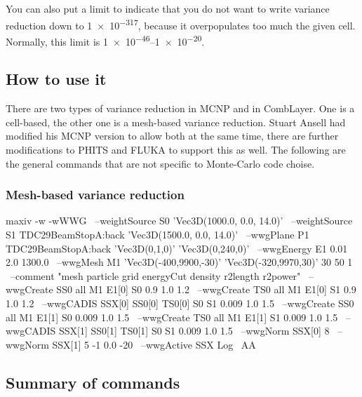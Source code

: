 You can also put a limit to indicate that you do not want to write variance reduction down to \num[retain-unity-mantissa=false]{1e-317}, because it overpopulates too much the given cell. Normally, this limit is \numrange[retain-unity-mantissa=false]{1e-46}{1e-20}.


\subsection{How to use it}

There are two types of variance reduction in MCNP and in CombLayer.
One is a cell-based, the other one is a mesh-based variance reduction.
Stuart Ansell had modified his MCNP version to allow both at the same time,
there are further modifications to PHITS and FLUKA to support this as well.
The following are the general commands that are not specific to Monte-Carlo
code choise.


\subsubsection{Mesh-based variance reduction}
\label{sec:vr:cadis:mesh}
 \label{bash:vr:cadis:mesh:run}

\begin{bash}
maxiv -w -wWWG \ 
 --weightSource S0 'Vec3D(1000.0, 0.0, 14.0)' \
 --weightSource S1 TDC29BeamStopA:back 'Vec3D(1500.0, 0.0, 14.0)' \
 --wwgPlane P1 TDC29BeamStopA:back 'Vec3D(0,1,0)' 'Vec3D(0,240,0)' \
 --wwgEnergy E1 0.01 2.0 1300.0 \
 --wwgMesh M1 'Vec3D(-400,9900,-30)' 'Vec3D(-320,9970,30)' 30 50 1 \
 --comment "mesh particle grid energyCut density r2length r2power"  \
 --wwgCreate SS0 all M1 E1[0] S0 0.9 1.0 1.2 \
 --wwgCreate TS0 all M1 E1[0] S1 0.9 1.0 1.2 \
 --wwgCADIS SSX[0] SS0[0] TS0[0] S0 S1 0.009 1.0 1.5 \
 --wwgCreate SS0 all M1 E1[1] S0 0.009 1.0 1.5 \
 --wwgCreate TS0 all M1 E1[1] S1 0.009 1.0 1.5 \
 --wwgCADIS SSX[1] SS0[1] TS0[1] S0 S1 0.009 1.0 1.5 \
 --wwgNorm SSX[0] 8 \
 --wwgNorm SSX[1] 5 -1 0.0 -20 \
 --wwgActive SSX Log \
 AA
\end{bash}

\subsection*{Summary of commands}

